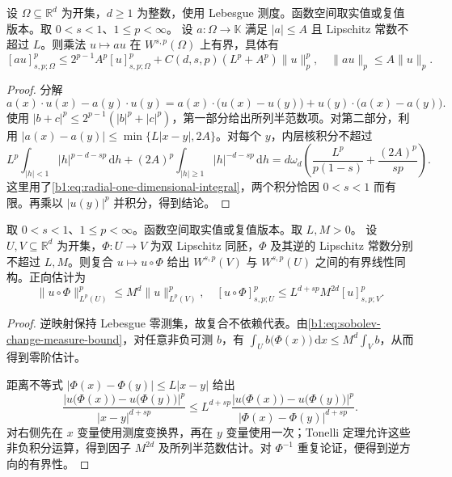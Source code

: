 \begin{proposition}\label{b1:prop:fractional-lipschitz-multiplier}
设 \(\Omega\subseteq\mathbb R^d\) 为开集，\(d\geq1\) 为整数，使用 Lebesgue 测度。函数空间取实值或复值版本。取 \(0<s<1\)、\(1\leq p<\infty\)。
设 \(a:\Omega\rightarrow\mathbb K\) 满足 \(|a|\leq A\) 且 Lipschitz 常数不超过 \(L\)。则乘法 \(u\mapsto au\) 在 \(W^{s,p}(\Omega)\) 上有界，具体有
\[
 [au]_{s,p;\Omega}^p
 \leq2^{p-1}A^p[u]_{s,p;\Omega}^p
       +C(d,s,p)(L^p+A^p)\|u\|_p^p,
 \quad \|au\|_p\leq A\|u\|_p.
\]
\end{proposition}
\begin{proof}
分解
\[
 a(x)\cdot u(x)-a(y)\cdot u(y)
 =a(x)\cdot\bigl(u(x)-u(y)\bigr)+u(y)\cdot\bigl(a(x)-a(y)\bigr).
\]
使用 \(|b+c|^p\leq2^{p-1}(|b|^p+|c|^p)\)，第一部分给出所列半范数项。对第二部分，利用
\(\bigl|a(x)-a(y)\bigr|\leq\min\{L|x-y|,2A\}\)。对每个 \(y\)，内层核积分不超过
\[
 L^p\int_{|h|<1}|h|^{p-d-sp}\,\mathrm dh
 +(2A)^p\int_{|h|\geq1}|h|^{-d-sp}\,\mathrm dh
 =d\omega_d\left(\frac{L^p}{p(1-s)}+\frac{(2A)^p}{sp}\right).
\]
这里用了\eqref{b1:eq:radial-one-dimensional-integral}，两个积分恰因 \(0<s<1\) 而有限。再乘以 \(|u(y)|^p\) 并积分，得到结论。
\end{proof}

\begin{proposition}\label{b1:prop:fractional-bilipschitz-change}
取 \(0<s<1\)、\(1\leq p<\infty\)。函数空间取实值或复值版本。取 \(L,M>0\)。
设 \(U,V\subseteq\mathbb R^d\) 为开集，\(\Phi:U\rightarrow V\) 为双 Lipschitz 同胚，\(\Phi\) 及其逆的 Lipschitz 常数分别不超过 \(L,M\)。则复合 \(u\mapsto u\circ\Phi\) 给出 \(W^{s,p}(V)\) 与 \(W^{s,p}(U)\) 之间的有界线性同构。正向估计为
\[
 \|u\circ\Phi\|_{L^p(U)}^p\leq M^d\|u\|_{L^p(V)}^p,
 \quad
 [u\circ\Phi]_{s,p;U}^p\leq L^{d+sp}M^{2d}[u]_{s,p;V}^p.
\]
\end{proposition}
\begin{proof}
逆映射保持 Lebesgue 零测集，故复合不依赖代表。由\eqref{b1:eq:sobolev-change-measure-bound}，对任意非负可测 \(b\)，有 \(\int_U b\bigl(\Phi(x)\bigr)\,\mathrm dx\leq M^d\int_Vb\)，从而得到零阶估计。

距离不等式 \(|\Phi(x)-\Phi(y)|\leq L|x-y|\) 给出
\[
 \frac{\bigl|u\bigl(\Phi(x)\bigr)-u\bigl(\Phi(y)\bigr)\bigr|^p}{|x-y|^{d+sp}}
 \leq L^{d+sp}
       \frac{\bigl|u\bigl(\Phi(x)\bigr)-u\bigl(\Phi(y)\bigr)\bigr|^p}{|\Phi(x)-\Phi(y)|^{d+sp}}.
\]
对右侧先在 \(x\) 变量使用测度变换界，再在 \(y\) 变量使用一次；Tonelli 定理允许这些非负积分运算，得到因子 \(M^{2d}\) 及所列半范数估计。对 \(\Phi^{-1}\) 重复论证，便得到逆方向的有界性。
\end{proof}

